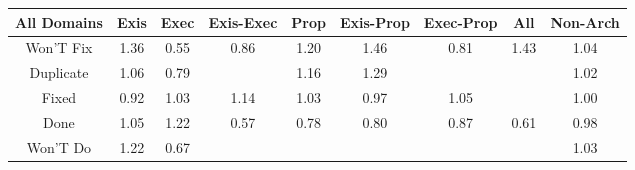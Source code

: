 \begin{tabular}{|c||c|c|c|c|c|c|c|c|}
\hline
All Domains & Exis & Exec & Exis-Exec & Prop & Exis-Prop & Exec-Prop & All & Non-Arch \\ 
\hline
Won'T Fix & \cellcolor[rgb]{0.8759826655782762,0.8238865258002361,0.42000000000000004} 1.36 & \cellcolor[rgb]{0.8307658077756146,0.4649581568045754,0.34604808725724023} 0.55 & \cellcolor[rgb]{0.8851477379725511,0.7223659597367418,0.39680455544104765} 0.86 & \cellcolor[rgb]{0.8910994149455751,0.8310470912900092,0.42} 1.20 & \cellcolor[rgb]{0.8662258373566069,0.8192648703268137,0.42} 1.46 & \cellcolor[rgb]{0.8774305653177576,0.685838009170719,0.38960186096324034} 0.81 & \cellcolor[rgb]{0.869579825836662,0.820853601712103,0.42} 1.43 & \cellcolor[rgb]{0.9064346395032117,0.8383111450278371,0.42} 1.04 \\ 
\hline
Duplicate & \cellcolor[rgb]{0.904524676996971,0.8374064259459336,0.42} 1.06 & \cellcolor[rgb]{0.8725458809668708,0.662717169909855,0.38504282223574604} 0.79 &  & \cellcolor[rgb]{0.8952129050335249,0.8329955865948275,0.42} 1.16 & \cellcolor[rgb]{0.8827627039307533,0.8270981229145672,0.42} 1.29 &  &  & \cellcolor[rgb]{0.9080008311330046,0.8390530252735284,0.42} 1.02 \\ 
\hline
Fixed & \cellcolor[rgb]{0.8967216907390132,0.7771493361646624,0.4076069113564123} 0.92 & \cellcolor[rgb]{0.9072407885897774,0.8386930051214734,0.42} 1.03 & \cellcolor[rgb]{0.8968353797571643,0.8337641272533935,0.42} 1.14 & \cellcolor[rgb]{0.9074183405049228,0.8387771086602266,0.42} 1.03 & \cellcolor[rgb]{0.9040832634926194,0.8119941138650648,0.4144777125931114} 0.97 & \cellcolor[rgb]{0.9051234964296597,0.8376900772561545,0.42} 1.05 &  & \cellcolor[rgb]{0.9097684682589767,0.8389040830924896,0.4197839037083782} 1.00 \\ 
\hline
Done & \cellcolor[rgb]{0.9051687588320956,0.8377115173415189,0.42} 1.05 & \cellcolor[rgb]{0.8896407067952529,0.8303561242714355,0.42} 1.22 & \cellcolor[rgb]{0.8346780461307195,0.48347608501873884,0.34969950972200486} 0.57 & \cellcolor[rgb]{0.8709975261620067,0.6553882905001646,0.3835976910845395} 0.78 & \cellcolor[rgb]{0.875796909942186,0.6781053737263466,0.38807711594604016} 0.80 & \cellcolor[rgb]{0.8870679359565388,0.7314548968609497,0.39859674022610275} 0.87 & \cellcolor[rgb]{0.8414480111955209,0.515520586325466,0.35601814378248625} 0.61 & \cellcolor[rgb]{0.9058603441960497,0.8204056291946352,0.4161363212496464} 0.98 \\ 
\hline
Won'T Do & \cellcolor[rgb]{0.8892653374200609,0.830178317725292,0.42} 1.22 & \cellcolor[rgb]{0.8524269730004218,0.5674876722019964,0.36626517480039367} 0.67 &  &  &  &  &  & \cellcolor[rgb]{0.9069505960962443,0.8385555455192735,0.42} 1.03 \\ 

\end{tabular}
